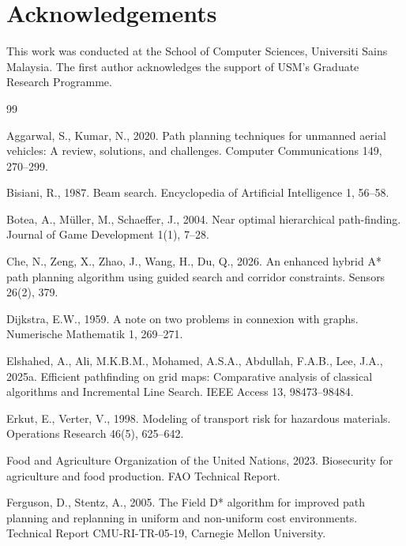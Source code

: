 \documentclass[preprint,12pt,authoryear]{elsarticle}
\begin{document}
\section*{Acknowledgements}
This work was conducted at the School of Computer Sciences, Universiti Sains Malaysia. The first author acknowledges the support of USM's Graduate Research Programme.




\begin{thebibliography}{99}

Aggarwal, S., Kumar, N., 2020.
Path planning techniques for unmanned aerial vehicles: A review, solutions, and challenges.
Computer Communications 149, 270--299.

Bisiani, R., 1987.
Beam search.
Encyclopedia of Artificial Intelligence 1, 56--58.

Botea, A., M{\"u}ller, M., Schaeffer, J., 2004.
Near optimal hierarchical path-finding.
Journal of Game Development 1(1), 7--28.

Che, N., Zeng, X., Zhao, J., Wang, H., Du, Q., 2026.
An enhanced hybrid A* path planning algorithm using guided search and corridor constraints.
Sensors 26(2), 379.

Dijkstra, E.W., 1959.
A note on two problems in connexion with graphs.
Numerische Mathematik 1, 269--271.

Elshahed, A., Ali, M.K.B.M., Mohamed, A.S.A., Abdullah, F.A.B., Lee, J.A., 2025a.
Efficient pathfinding on grid maps: Comparative analysis of classical algorithms and Incremental Line Search.
IEEE Access 13, 98473--98484.

Erkut, E., Verter, V., 1998.
Modeling of transport risk for hazardous materials.
Operations Research 46(5), 625--642.

Food and Agriculture Organization of the United Nations, 2023.
Biosecurity for agriculture and food production.
FAO Technical Report.

Ferguson, D., Stentz, A., 2005.
The Field D* algorithm for improved path planning and replanning in uniform and non-uniform cost environments.
Technical Report CMU-RI-TR-05-19, Carnegie Mellon University.


\end{thebibliography}
\end{document}
